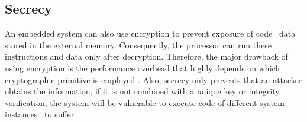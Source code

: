 \subsection{Secrecy}
\label{subsec:Secrecy}

An embedded system can also use encryption to prevent exposure of code \andor~data stored in the external memory. Consequently, the processor can run these instructions and data only after decryption. Therefore, the major drawback of using encryption is the performance overhead that highly depends on which cryptographic primitive is employed \cite{Suh2007:PUFs}. Also, secrecy only prevents that an attacker obtains the information, if it is not combined with a unique key or integrity verification, the system will be vulnerable to execute code of different system instances \andor~to suffer  

